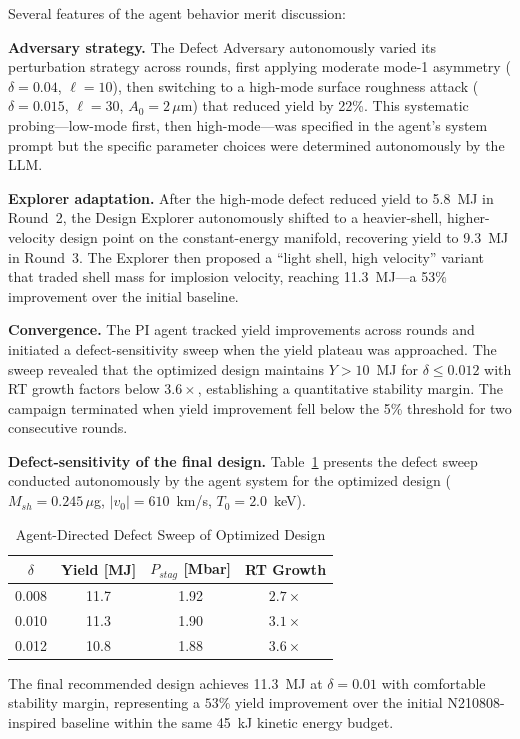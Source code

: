 \documentclass[conference]{IEEEtran}
\begin{document}
Several features of the agent behavior merit discussion:

\textbf{Adversary strategy.} The Defect Adversary autonomously varied its perturbation strategy across rounds, first applying moderate mode-1 asymmetry ($\delta = 0.04$, $\ell = 10$), then switching to a high-mode surface roughness attack ($\delta = 0.015$, $\ell = 30$, $A_0 = 2\,\mu$m) that reduced yield by 22\%.  This systematic probing---low-mode first, then high-mode---was specified in the agent's system prompt but the specific parameter choices were determined autonomously by the LLM.

\textbf{Explorer adaptation.} After the high-mode defect reduced yield to 5.8~MJ in Round~2, the Design Explorer autonomously shifted to a heavier-shell, higher-velocity design point on the constant-energy manifold, recovering yield to 9.3~MJ in Round~3.  The Explorer then proposed a ``light shell, high velocity'' variant that traded shell mass for implosion velocity, reaching 11.3~MJ---a 53\% improvement over the initial baseline.

\textbf{Convergence.} The PI agent tracked yield improvements across rounds and initiated a defect-sensitivity sweep when the yield plateau was approached.  The sweep revealed that the optimized design maintains $Y > 10$~MJ for $\delta \leq 0.012$ with RT growth factors below $3.6\times$, establishing a quantitative stability margin.  The campaign terminated when yield improvement fell below the 5\% threshold for two consecutive rounds.

\textbf{Defect-sensitivity of the final design.} Table~\ref{tab:agent_sweep} presents the defect sweep conducted autonomously by the agent system for the optimized design ($M_{sh} = 0.245\,\mu$g, $|v_0| = 610$~km/s, $T_0 = 2.0$~keV).

\begin{table}[htbp]
\caption{Agent-Directed Defect Sweep of Optimized Design}
\label{tab:agent_sweep}
\centering
\begin{tabular}{cccc}
\toprule
$\delta$ & Yield [MJ] & $P_{stag}$ [Mbar] & RT Growth \\
\midrule
0.008 & 11.7 & 1.92 & $2.7\times$ \\
0.010 & 11.3 & 1.90 & $3.1\times$ \\
0.012 & 10.8 & 1.88 & $3.6\times$ \\
\bottomrule
\end{tabular}
\end{table}

The final recommended design achieves 11.3~MJ at $\delta = 0.01$ with comfortable stability margin, representing a $53\%$ yield improvement over the initial N210808-inspired baseline within the same 45~kJ kinetic energy budget.
\end{document}
